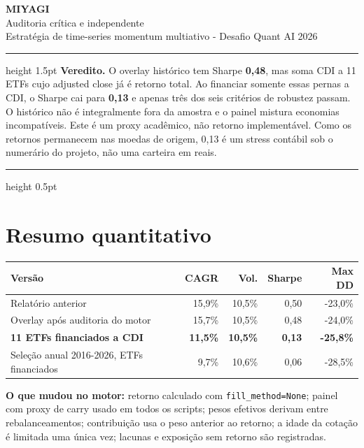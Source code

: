 \documentclass[10pt,a4paper]{article}
\newenvironment{callout}{\begin{center}\begin{minipage}{0.95\linewidth}\color{navy}\hrule height 1.5pt\vspace{2mm}\color{black}}{\vspace{1mm}\color{navy}\hrule height 0.5pt\end{minipage}\end{center}}
\begin{document}
{\Huge\color{navy}\textbf{MIYAGI}}\\[3mm]
{\Large Auditoria crítica e independente}\\[2mm]
{\small Estratégia de time-series momentum multiativo - Desafio Quant AI 2026}

\begin{callout}
\textbf{Veredito.} O overlay histórico tem Sharpe \textbf{0,48}, mas soma CDI a
11 ETFs cujo adjusted close já é retorno total. Ao financiar somente essas
pernas a CDI, o Sharpe cai para \textbf{0,13} e apenas três dos seis critérios
de robustez passam. O histórico não é integralmente fora da amostra e o painel
mistura economias incompatíveis. Este é um proxy acadêmico, não retorno
implementável. Como os retornos permanecem nas moedas de origem, 0,13 é um
stress contábil sob o numerário do projeto, não uma carteira em reais.
\end{callout}

\section*{Resumo quantitativo}
\begin{tabularx}{\textwidth}{Xrrrr}
\toprule
Versão & CAGR & Vol. & Sharpe & Max DD\\
\midrule
Relatório anterior & 15,9\% & 10,5\% & 0,50 & -23,0\%\\
Overlay após auditoria do motor & 15,7\% & 10,5\% & 0,48 & -24,0\%\\
\textbf{11 ETFs financiados a CDI} & \textbf{11,5\%} & \textbf{10,5\%} & \textbf{0,13} & \textbf{-25,8\%}\\
Seleção anual 2016-2026, ETFs financiados & 9,7\% & 10,6\% & 0,06 & -28,5\%\\
\bottomrule
\end{tabularx}

\textbf{O que mudou no motor:} retorno calculado com
\texttt{fill\_method=None}; painel com proxy de carry usado em todos os scripts; pesos
efetivos derivam entre rebalanceamentos; contribuição usa o peso anterior ao
retorno; a idade da cotação é limitada uma única vez; lacunas e exposição sem
retorno são registradas.
\end{document}
